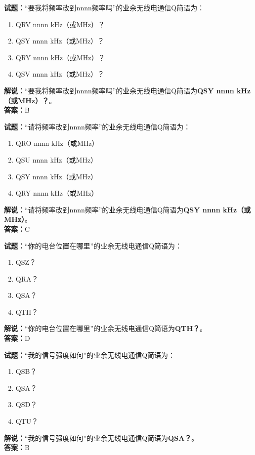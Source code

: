 \documentclass{ctexbook}
\begin{document}
\bigskip


\noindent\textbf{试题：}“要我将频率改到nnnn频率吗”的业余无线电通信Q简语为：
\begin{enumerate}[leftmargin=3em]
\item QRV nnnn \si{\kHz}（或\unit{\MHz}）？
\item QSY nnnn \si{\kHz}（或\unit{\MHz}）？
\item QRY nnnn \si{\kHz}（或\unit{\MHz}）？
\item QSV nnnn \si{\kHz}（或\unit{\MHz}）？
\end{enumerate}
\noindent\textbf{解说：}“要我将频率改到nnnn频率吗”的业余无线电通信Q简语为\textbf{QSY nnnn \si{\kHz}（或\unit{\MHz}）？}。\\\noindent\textbf{答案：}B



\bigskip


\noindent\textbf{试题：}“请将频率改到nnnn频率”的业余无线电通信Q简语为：
\begin{enumerate}[leftmargin=3em]
\item QRO nnnn \si{\kHz}（或\unit{\MHz}）
\item QSU nnnn \si{\kHz}（或\unit{\MHz}）
\item QSY nnnn \si{\kHz}（或\unit{\MHz}）
\item QRY nnnn \si{\kHz}（或\unit{\MHz}）
\end{enumerate}
\noindent\textbf{解说：}“请将频率改到nnnn频率”的业余无线电通信Q简语为\textbf{QSY nnnn \si{\kHz}（或\unit{\MHz}）}。\\\noindent\textbf{答案：}C



\bigskip


\noindent\textbf{试题：}“你的电台位置在哪里”的业余无线电通信Q简语为：
\begin{enumerate}[leftmargin=3em]
\item QSZ？
\item QRA？
\item QSA？
\item QTH？
\end{enumerate}
\noindent\textbf{解说：}“你的电台位置在哪里”的业余无线电通信Q简语为\textbf{QTH？}。\\\noindent\textbf{答案：}D



\bigskip


\noindent\textbf{试题：}“我的信号强度如何”的业余无线电通信Q简语为：
\begin{enumerate}[leftmargin=3em]
\item QSB？
\item QSA？
\item QSD？
\item QTU？
\end{enumerate}
\noindent\textbf{解说：}“我的信号强度如何”的业余无线电通信Q简语为\textbf{QSA？}。\\\noindent\textbf{答案：}B
\end{document}
